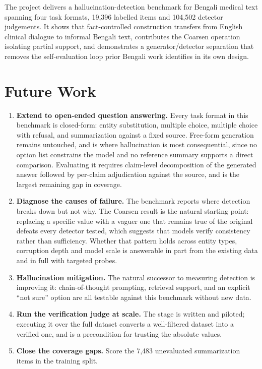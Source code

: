\documentclass{iutbscthesis}
\begin{document}
The project delivers a hallucination-detection benchmark for Bengali medical text spanning four task formats, 19,396 labelled items and 104,502 detector judgements. It shows that fact-controlled construction transfers from English clinical dialogue to informal Bengali text, contributes the Coarsen operation isolating partial support, and demonstrates a generator/detector separation that removes the self-evaluation loop prior Bengali work identifies in its own design.

\section{Future Work}

\begin{enumerate}
    \item \textbf{Extend to open-ended question answering.} Every task format in this benchmark is closed-form: entity substitution, multiple choice, multiple choice with refusal, and summarization against a fixed source. Free-form generation remains untouched, and is where hallucination is most consequential, since no option list constrains the model and no reference summary supports a direct comparison. Evaluating it requires claim-level decomposition of the generated answer followed by per-claim adjudication against the source, and is the largest remaining gap in coverage.
    \item \textbf{Diagnose the causes of failure.} The benchmark reports where detection breaks down but not why. The Coarsen result is the natural starting point: replacing a specific value with a vaguer one that remains true of the original defeats every detector tested, which suggests that models verify consistency rather than sufficiency. Whether that pattern holds across entity types, corruption depth and model scale is answerable in part from the existing data and in full with targeted probes.
    \item \textbf{Hallucination mitigation.} The natural successor to measuring detection is improving it: chain-of-thought prompting, retrieval support, and an explicit ``not sure'' option are all testable against this benchmark without new data.
    \item \textbf{Run the verification judge at scale.} The stage is written and piloted; executing it over the full dataset converts a well-filtered dataset into a verified one, and is a precondition for trusting the absolute values.
    \item \textbf{Close the coverage gaps.} Score the 7,483 unevaluated summarization items in the training split.

\end{enumerate}
\end{document}
